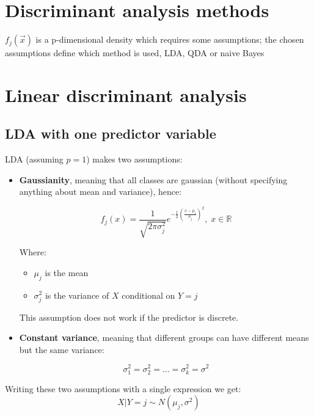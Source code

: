   \section{Discriminant analysis methods}
    $f_j(\vec{x})$ is a p-dimensional density which requires some assumptions; the chosen assumptions define which method is used, LDA, QDA or naive Bayes 

  \section{Linear discriminant analysis}

    \subsection{LDA with one predictor variable}
      LDA (assuming $p=1$) makes two assumptions:
      \begin{itemize}
        \item \textbf{Gaussianity}, meaning that all classes are gaussian (without specifying anything about mean and variance), hence:

        $$f_j(x) = \frac{1}{\sqrt{2\pi\sigma^2_j}} e^{-\frac{1}{2}\left(\frac{x-\mu_i}{\sigma_j}\right)^2},\;x\in\mathbb{R}$$

        Where:
        \begin{itemize}
          \item $\mu_j$ is the mean
          \item $\sigma_j^2$ is the variance of $X$ conditional on $Y=j$
        \end{itemize}
        
        This assumption does not work if the predictor is discrete.

        \item \textbf{Constant variance}, meaning that different groups can have different means but the same variance:

        $$\sigma_1^2 = \sigma_2^2 = \dots = \sigma_k^2 = \sigma^2$$

      \end{itemize}

      Writing these two assumptions with a single expression we get:
      $$X|Y = j \sim N(\mu_j, \sigma^2)$$


